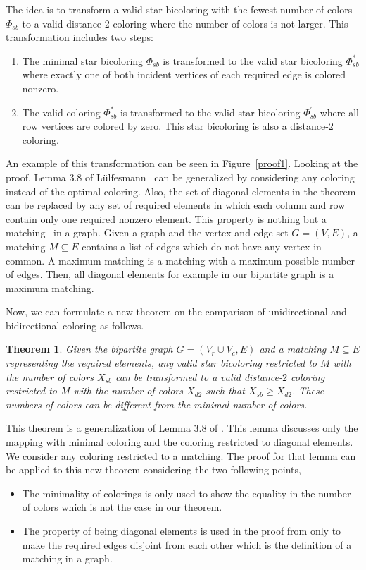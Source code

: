 \documentclass[12pt, twoside,a4paper,toc=bibliography]{scrbook}
\newtheorem{theorem}{Theorem}
\newcommand{\figref}[1]{Figure~\protect\ref{#1}}
\begin{document}
The idea is to transform a valid star bicoloring with the fewest number of colors $\Phi_{sb}$ to
a valid distance-$2$ coloring where the number of colors is not larger.
This transformation includes two steps:
\begin{enumerate}
\item The minimal star bicoloring $\Phi_{sb}$ is transformed
to the valid star bicoloring $\Phi_{sb}^{*}$
where exactly one of both incident vertices of each required edge is colored nonzero.
\item The valid coloring $\Phi_{sb}^{*}$ is transformed
to the valid star bicoloring $\Phi_{sb}^{'}$ where all row vertices are colored by zero.
This star bicoloring is also a distance-$2$ coloring.
\end{enumerate}
An example of this transformation can be seen in \figref{proof1}.
Looking at the proof, Lemma 3.8 of Lülfesmann~\cite{Lulfesmann2012Fap} can be generalized by considering any
coloring instead of the optimal coloring.
Also, the set of diagonal elements in the theorem
can be replaced by any set of required elements
in which each column and row contain only one required nonzero element.
This property is nothing but a matching~\cite{bondy2008graph} in a graph.
Given a graph and the vertex and edge set $G=(V,E)$, a matching $M\subseteq E$ contains
a list of edges which do not have any vertex in common.
A maximum matching is a matching with a maximum possible number of edges.
Then, all diagonal elements for example in our bipartite graph is a maximum matching.

Now, we can formulate a new theorem on the comparison of unidirectional and
bidirectional coloring as follows.
\begin{theorem}
\label{t.matching}
Given the bipartite graph $G=(V_r\cup V_c,E)$ and a matching $M\subseteq E$ representing
the required elements, any valid star bicoloring restricted to $M$
with the number of colors $X_{sb}$
can be transformed to a valid distance-$2$ coloring restricted to $M$
with the number of colors $X_{d2}$ such that $X_{sb} \geq X_{d2}$.
These numbers of colors can be different from the minimal number of colors.
\end{theorem}
This theorem is a generalization of Lemma 3.8 of \cite{Lulfesmann2012Fap}.
This lemma discusses only the mapping with minimal coloring
and the coloring restricted to diagonal elements. We consider any coloring
restricted to a matching.
The proof for that lemma can be applied to this new theorem considering the two following points,
\begin{itemize}
\item The minimality of colorings is only used to show the equality in the number of colors which is not
the case in our theorem.
\item The property of being diagonal elements is used in the proof from \cite{Lulfesmann2012Fap} only to
make the required edges disjoint from each other which is the definition of a matching in a graph.
\end{itemize}
\end{document}

